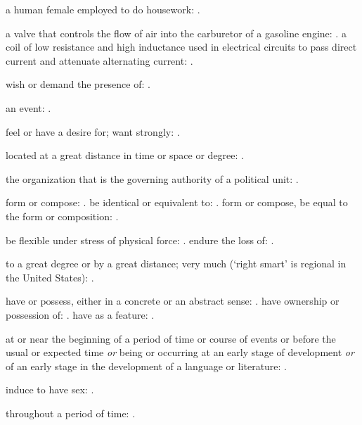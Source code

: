   a human female employed to do housework:   .

  a valve that controls the flow of air into the carburetor of a gasoline engine: . a coil of low resistance and high inductance used in electrical circuits to pass direct current and attenuate alternating current:   .

  wish or demand the presence of: .

  an event: .

  feel or have a desire for; want strongly:   .

  located at a great distance in time or space or degree: .

  the organization that is the governing authority of a political unit:   .

  form or compose:   . be identical or equivalent to:   . form or compose, be equal to the form or composition: .

  be flexible under stress of physical force:   . endure the loss of:   .

  to a great degree or by a great distance; very much (`right smart' is regional in the United States):   .

  have or possess, either in a concrete or an abstract sense:   . have ownership or possession of:   . have as a feature:   .

  at or near the beginning of a period of time or course of events or before the usual or expected time \textit{or} being or occurring at an early stage of development \textit{or} of an early stage in the development of a language or literature: .

  induce to have sex:   .

  throughout a period of time:   .

